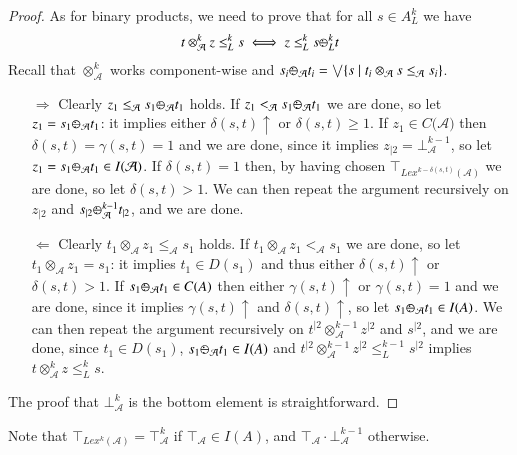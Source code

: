 \documentclass[a4paper]{elsarticle}
\newcommand{\1}{\mathbf{1}}
\def\odiv{{ \ominus\hspace{-8pt}:}\;}
\begin{document}
\begin{proof}
As for binary products, we need to prove that for all $s \in A^k_L$ we have
$$t \otimes^k_\mathcal{A} z \leq^k_L s \iff z \leq^k_L s \odiv^k_L t$$
%
Recall that $\otimes^k_\mathcal{A}$ works component-wise and 
$s_i \odiv_\mathcal{A} t_i = \bigvee \{s \mid t_i \otimes_\mathcal{A} s \leq_\mathcal{A} s_i\}$.

\begin{itemize}
\item[$\Rightarrow$] Clearly $z_1 \leq_\mathcal{A} s_1 \odiv_\mathcal{A} t_1$ holds.
If $z_1 <_\mathcal{A} s_1 \odiv_\mathcal{A} t_1$ we are done, so let 
$z_1 = s_1 \odiv_\mathcal{A} t_1$: it implies either $\delta(s,t){\uparrow}$ or $\delta(s,t) \geq 1$.
If $z_1 \in C(\mathcal{A)}$ then $\delta(s,t) = \gamma(s,t) = 1$ and we are done, 
since it implies $z_{\mid 2} = \bot^{k-1}_\mathcal{A}$, so let $z_1 = s_1 \odiv_\mathcal{A} t_1 \in I(\mathcal{A)}$.
If $\delta(s,t) = 1$ then, by having chosen $\top_{Lex^{k-\delta(s,t)}(\mathcal{A})}$ we are done, so let $\delta(s,t) > 1$.
We can then repeat the argument recursively on $z_{\mid 2}$ and $s_{\mid 2} \odiv^{k-1}_\mathcal{A} t_{\mid 2}$, 
and we are done.

\item[$\Leftarrow$]
Clearly $t_1 \otimes_\mathcal{A} z_1 \leq_\mathcal{A} s_1$ holds.
If $t_1 \otimes_\mathcal{A} z_1 <_\mathcal{A} s_1$ we are done, so let 
$t_1 \otimes_\mathcal{A} z_1 = s_1$: it implies $t_1 \in D(s_1)$ and thus either $\delta(s,t){\uparrow}$ or $\delta(s,t) > 1$.
If $s_1 \odiv_\mathcal{A} t_1 \in C(A)$ then either $\gamma(s,t){\uparrow}$ or $\gamma(s,t)=1$
and we are done, since it implies $\gamma(s,t){\uparrow}$ and $\delta(s,t){\uparrow}$,
so let $s_1 \odiv_\mathcal{A} t_1 \in I(A)$.
We can then repeat the argument recursively on $t^{\mid 2} \otimes^{k-1}_\mathcal{A} z^{\mid 2}$ and
$s^{\mid 2}$, and we are done,
since $t_1 \in D(s_1)$,
$s_1 \odiv_\mathcal{A} t_1 \in I(A)$ 
and $t^{\mid 2} \otimes^{k-1}_\mathcal{A} z^{\mid 2} \leq^{k-1}_L s^{\mid 2}$
implies 
$t \otimes^k_\mathcal{A} z \leq^k_L s$.
\end{itemize}
The proof that $\bot_\mathcal{A}^k$ is the bottom element is straightforward.
\end{proof}

Note that $\top_{Lex^k(\mathcal{A})} = \top^k_\mathcal{A}$
if $\top_\mathcal{A} \in I(A)$, and  $\top_\mathcal{A} \cdot \bot^{k-1}_\mathcal{A}$ 
otherwise.
\end{document}
